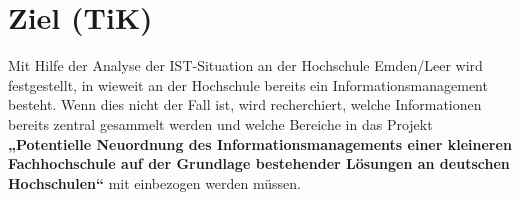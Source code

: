\section{Ziel (TiK)}
Mit Hilfe der Analyse der IST-Situation an der Hochschule Emden/Leer wird festgestellt, in wieweit an der Hochschule bereits ein Informationsmanagement besteht. Wenn dies nicht der Fall ist, wird recherchiert, welche Informationen bereits zentral gesammelt werden und welche Bereiche in das Projekt \textbf{„Potentielle Neuordnung des Informationsmanagements einer kleineren Fachhochschule auf der Grundlage bestehender Lösungen an deutschen Hochschulen“} mit einbezogen werden müssen.